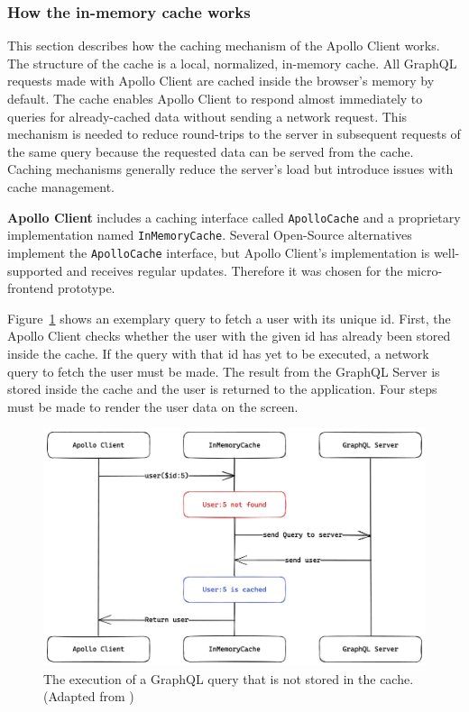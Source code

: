 \subsubsection{How the in-memory cache works}\label{subsubsection:background:graphql:apollo-server-client:in-memory-cache-working}

This section describes how the caching mechanism of the Apollo Client works. The structure of the cache is a local, normalized, in-memory cache. All GraphQL requests made with Apollo Client are cached inside the browser's memory by default. The cache enables Apollo Client to respond almost immediately to queries for already-cached data without sending a network request. This mechanism is needed to reduce round-trips to the server in subsequent requests of the same query because the requested data can be served from the cache. \cite{misc:-:background:graphql:apollo-client-cache-overview} Caching mechanisms generally reduce the server's load but introduce issues with cache management.

\bigskip

\noindent \textbf{Apollo Client} includes a caching interface called \texttt{ApolloCache} and a proprietary implementation named \texttt{InMemoryCache}. Several Open-Source alternatives implement the \texttt{ApolloCache} interface, but Apollo Client's implementation is well-supported and receives regular updates. Therefore it was chosen for the micro-frontend prototype.

\bigskip

\noindent Figure~\ref{fig:background:graphql:user-query-first-time} shows an exemplary query to fetch a user with its unique id. First, the Apollo Client checks whether the user with the given id has already been stored inside the cache. If the query with that id has yet to be executed, a network query to fetch the user must be made. The result from the GraphQL Server is stored inside the cache and the user is returned to the application. Four steps must be made to render the user data on the screen. \cite{misc:-:background:graphql:apollo-client-cache-overview}

\ifshowImages
\begin{figure}[H]
  \centering
  \includegraphics[width=0.6\linewidth]{images/background/graphql/apollo/apollo-client-basic-cache.png}
  \caption{The execution of a GraphQL query that is not stored in the cache. (Adapted from \cite{misc:-:background:graphql:apollo-client-cache-overview})}\label{fig:background:graphql:user-query-first-time}
\end{figure}
\fi

